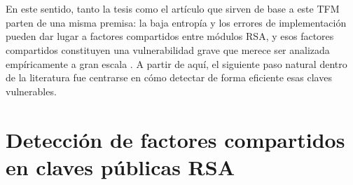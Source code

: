 \\
\\
En este sentido, tanto la tesis como el artículo que sirven de base a este TFM parten de una misma premisa: la baja entropía y los errores de implementación pueden dar lugar a factores compartidos entre módulos RSA, y esos factores compartidos constituyen una vulnerabilidad grave que merece ser analizada empíricamente a gran escala \cite{vage2022finding,pelofske2024efficient}. A partir de aquí, el siguiente paso natural dentro de la literatura fue centrarse en cómo detectar de forma eficiente esas claves vulnerables.

\section{Detección de factores compartidos en claves públicas RSA}

